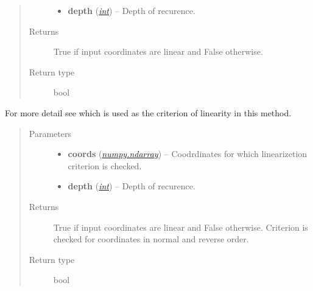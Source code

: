 \documentclass[a4paper,10pt,english]{sphinxmanual}
\begin{document}
\begin{fulllineitems}
\begin{fulllineitems}
\begin{quote}
\begin{description}
\begin{itemize}
\item {} 
\textbf{depth} (\href{http://docs.python.org/2/library/functions.html\#int}{\emph{int}}) -- Depth of recurence.

\end{itemize}

\item[{Returns}] \leavevmode
True if input coordinates are linear and False otherwise.

\item[{Return type}] \leavevmode
bool

\end{description}\end{quote}

\end{fulllineitems}


\begin{fulllineitems}
\label{aqueduct.geom.traces:aqueduct.geom.traces.VectorLinearize.is_linear}
For more detail see {\hyperref[aqueduct.geom.traces:aqueduct.geom.traces.VectorLinearize.is_linear_core]{}} which is used as the criterion of linearity in this method.
\begin{quote}\begin{description}
\item[{Parameters}] \leavevmode\begin{itemize}
\item {} 
\textbf{coords} (\href{http://docs.scipy.org/doc/numpy/reference/generated/numpy.ndarray.html\#numpy.ndarray}{\emph{numpy.ndarray}}) -- Coodrdinates for which linearizetion criterion is checked.

\item {} 
\textbf{depth} (\href{http://docs.python.org/2/library/functions.html\#int}{\emph{int}}) -- Depth of recurence.

\end{itemize}

\item[{Returns}] \leavevmode
True if input coordinates are linear and False otherwise. Criterion is checked for coordinates in normal and reverse order.

\item[{Return type}] \leavevmode
bool

\end{description}\end{quote}

\end{fulllineitems}


\end{fulllineitems}
\end{document}
